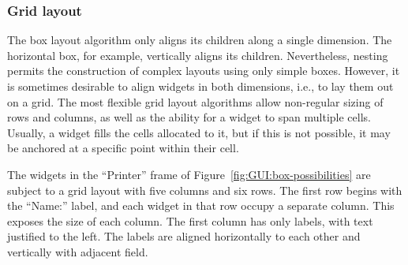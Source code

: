 \subsubsection{Grid layout}
\label{sec:GUI:grid-layout}

The box layout algorithm only aligns its children along a single
dimension. The horizontal box, for example, vertically aligns its
children. Nevertheless, nesting permits the construction of complex
layouts using only simple boxes. However, it is sometimes desirable to
align widgets in both dimensions, i.e., to lay them out on a grid. The
most flexible grid layout algorithms allow non-regular sizing of rows
and columns, as well as the ability for a widget to span multiple
cells. Usually, a widget fills the cells allocated to it, but if this
is not possible, it may be anchored at a specific point within their
cell. 

The widgets in the ``Printer'' frame of
Figure~\ref{fig:GUI:box-possibilities} are subject to a grid layout
with five columns and six rows. The first row begins with the
``Name:'' label, and each widget in that row occupy a separate
column. This exposes the size of each column. The first column has
only labels, with text justified to the left.  The labels are aligned
horizontally to each other and vertically with adjacent field.













